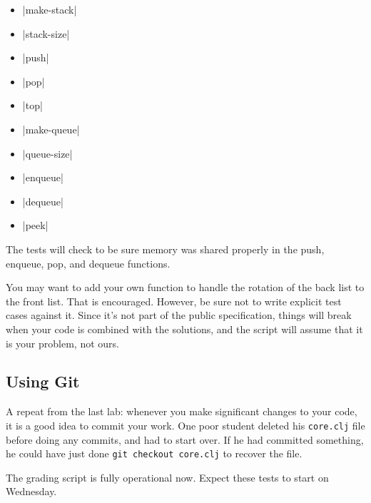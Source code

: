 \documentclass[12pt]{article}
\begin{document}
\begin{itemize}
\item {}|make-stack| 
\item {}|stack-size|
\item {}|push| 
\item {}|pop|
\item {}|top|
\item {}|make-queue|
\item {}|queue-size|
\item {}|enqueue|
\item {}|dequeue|
\item {}|peek|
\end{itemize}

The tests will check to be sure memory was shared properly in the push, enqueue, pop, and dequeue functions.

You may want to add your own function to handle the rotation of the back list to the front list.
That is encouraged.  However, be sure not to write explicit test cases against it.  Since it's not
part of the public specification, things will break when your code is combined with the solutions,
and the script will assume that it is your problem, not ours.

\subsection{Using Git}

A repeat from the last lab:
whenever you make significant changes to your code, it is a good idea to commit your work.
One poor student deleted his \texttt{core.clj} file before doing any commits, and had to start over.
If he had committed something, he could have just done \verb|git checkout core.clj| to recover the
file.

The grading script is fully operational now.  Expect these tests to start on Wednesday.
\end{document}
